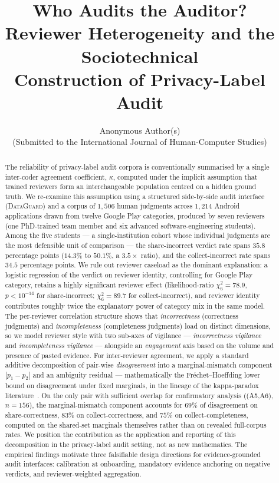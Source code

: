 \documentclass[11pt,a4paper]{article}
\title{\bfseries Who Audits the Auditor? \\[2pt]
\large Reviewer Heterogeneity and the Sociotechnical \\
Construction of Privacy-Label Audit}
\author{Anonymous Author(s)\\\small (Submitted to the International Journal of Human-Computer Studies)}
\date{}
\newcommand{\dataguard}{\textsc{DataGuard}}
\newcommand{\Acc}[1]{\textsf{A#1}}
\begin{document}
\maketitle

\begin{abstract}
\noindent
The reliability of privacy-label audit corpora is conventionally
summarised by a single inter-coder agreement coefficient, $\kappa$,
computed under the implicit assumption that trained reviewers form an
interchangeable population centred on a hidden ground truth. We
re-examine this assumption using a structured side-by-side audit
interface (\dataguard{}) and a corpus of $1{,}506$ human judgments
across $1{,}214$ Android applications drawn from twelve Google Play
categories, produced by seven reviewers (one PhD-trained team member
and six advanced software-engineering students). Among the five
students --- a single-institution cohort whose individual judgments
are the most defensible unit of comparison --- the share-incorrect
verdict rate spans $35.8$ percentage points ($14.3\%$ to $50.1\%$,
a $3.5{\times}$ ratio), and the collect-incorrect rate spans $34.5$
percentage points. We rule out reviewer caseload as the dominant
explanation: a logistic regression of the verdict on reviewer
identity, controlling for Google Play category, retains a highly
significant reviewer effect (likelihood-ratio
$\chi^2_{6}=78.9$, $p<10^{-14}$ for share-incorrect; $\chi^2_{6}=89.7$
for collect-incorrect), and reviewer identity contributes roughly
twice the explanatory power of category mix in the same model. The
per-reviewer correlation structure shows that
\emph{incorrectness} (correctness judgments) and
\emph{incompleteness} (completeness judgments) load on distinct
dimensions, so we model reviewer style with two
sub-axes of vigilance --- \emph{incorrectness vigilance} and
\emph{incompleteness vigilance} --- alongside an \emph{engagement}
axis based on the volume and presence of pasted evidence. For
inter-reviewer agreement, we apply a standard additive decomposition
of pair-wise \emph{disagreement} into a marginal-mismatch component
$|p_1-p_2|$ and an ambiguity residual --- mathematically the
Fr\'echet--Hoeffding lower bound on disagreement under fixed
marginals, in the lineage of the kappa-paradox
literature~\citep{feinstein1990high,byrt1993bias,gwet2008computing}.
On the only pair with sufficient overlap for confirmatory analysis
((\Acc{5},\Acc{6}), $n=156$), the marginal-mismatch component
accounts for $69\%$ of disagreement on share-correctness, $83\%$ on
collect-correctness, and $75\%$ on collect-completeness, computed
on the shared-set marginals themselves rather than on revealed
full-corpus rates. We position the contribution as the application
and reporting of this decomposition in the privacy-label audit
setting, not as new mathematics. The empirical findings motivate
three falsifiable design directions for evidence-grounded audit
interfaces: calibration at onboarding, mandatory evidence anchoring
on negative verdicts, and reviewer-weighted aggregation.
\end{abstract}
\end{document}
